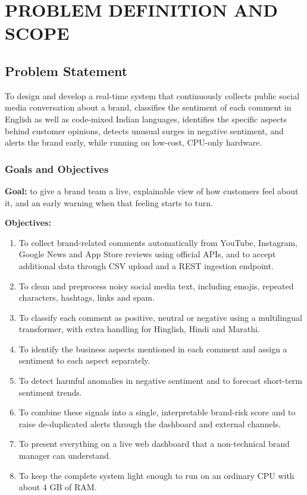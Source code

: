 \documentclass[12pt,a4paper]{report}
\begin{document}
\chapter{PROBLEM DEFINITION \vspace*{0.5\baselineskip} AND SCOPE}

\section{Problem Statement}

To design and develop a real-time system that continuously collects public social media conversation about a brand, classifies the sentiment of each comment in English as well as code-mixed Indian languages, identifies the specific aspects behind customer opinions, detects unusual surges in negative sentiment, and alerts the brand early, while running on low-cost, CPU-only hardware.

\subsection{Goals and Objectives}

\textbf{Goal:} to give a brand team a live, explainable view of how customers feel about it, and an early warning when that feeling starts to turn.

\textbf{Objectives:}
\begin{enumerate}
    \item To collect brand-related comments automatically from YouTube, Instagram, Google News and App Store reviews using official APIs, and to accept additional data through CSV upload and a REST ingestion endpoint.
    \item To clean and preprocess noisy social media text, including emojis, repeated characters, hashtags, links and spam.
    \item To classify each comment as positive, neutral or negative using a multilingual transformer, with extra handling for Hinglish, Hindi and Marathi.
    \item To identify the business aspects mentioned in each comment and assign a sentiment to each aspect separately.
    \item To detect harmful anomalies in negative sentiment and to forecast short-term sentiment trends.
    \item To combine these signals into a single, interpretable brand-risk score and to raise de-duplicated alerts through the dashboard and external channels.
    \item To present everything on a live web dashboard that a non-technical brand manager can understand.
    \item To keep the complete system light enough to run on an ordinary CPU with about 4 GB of RAM.
\end{enumerate}
\end{document}
